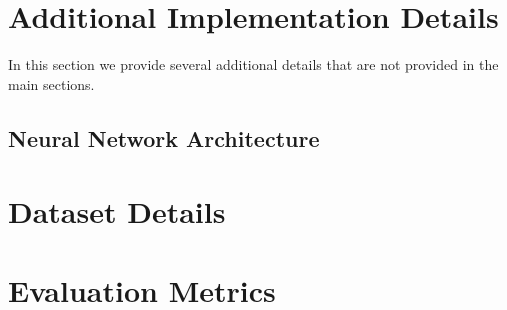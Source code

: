 \clearpage
\appendix
\section{Additional Implementation Details}
In this section we provide several additional details that are not provided in the main sections.
\subsection{Neural Network Architecture}
\subsection{}
\section{Dataset Details}
\section{Evaluation Metrics}
